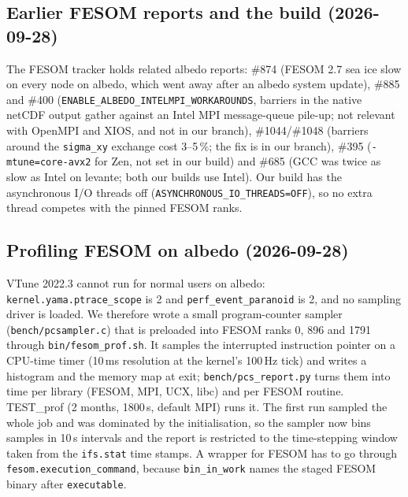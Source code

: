 \documentclass[11pt,a4paper]{article}
\begin{document}
\subsection{Earlier FESOM reports and the build (2026-09-28)}
The FESOM tracker holds related albedo reports: \#874 (FESOM 2.7 sea ice slow on every node on albedo, which went away after an albedo system update), \#885 and \#400 (\texttt{ENABLE\_ALBEDO\_INTELMPI\_WORKAROUNDS}, barriers in the native netCDF output gather against an Intel MPI message-queue pile-up; not relevant with OpenMPI and XIOS, and not in our branch), \#1044/\#1048 (barriers around the \texttt{sigma\_xy} exchange cost 3--5\,\%; the fix is in our branch), \#395 (\texttt{-mtune=core-avx2} for Zen, not set in our build) and \#685 (GCC was twice as slow as Intel on levante; both our builds use Intel). Our build has the asynchronous I/O threads off (\texttt{ASYNCHRONOUS\_IO\_THREADS=OFF}), so no extra thread competes with the pinned FESOM ranks.

\subsection{Profiling FESOM on albedo (2026-09-28)}
VTune 2022.3 cannot run for normal users on albedo: \texttt{kernel.yama.ptrace\_scope} is 2 and \texttt{perf\_event\_paranoid} is 2, and no sampling driver is loaded. We therefore wrote a small program-counter sampler (\texttt{bench/pcsampler.c}) that is preloaded into FESOM ranks 0, 896 and 1791 through \texttt{bin/fesom\_prof.sh}. It samples the interrupted instruction pointer on a CPU-time timer (10\,ms resolution at the kernel's 100\,Hz tick) and writes a histogram and the memory map at exit; \texttt{bench/pcs\_report.py} turns them into time per library (FESOM, MPI, UCX, libc) and per FESOM routine. TEST\_prof (2 months, 1800\,s, default MPI) runs it. The first run sampled the whole job and was dominated by the initialisation, so the sampler now bins samples in 10\,s intervals and the report is restricted to the time-stepping window taken from the \texttt{ifs.stat} time stamps. A wrapper for FESOM has to go through \texttt{fesom.execution\_command}, because \texttt{bin\_in\_work} names the staged FESOM binary after \texttt{executable}.
\end{document}

